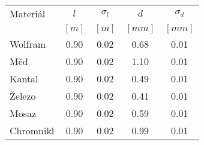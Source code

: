 \begin{tabular}{lSSSS}                                                     \toprule
Materiál  & {$l$}        & {$\sigma_l$} & {$d$}         & {$\sigma_d$}  \\
          & {$[\si{m}]$} & {$[\si{m}]$} & {$[\si{mm}]$} & {$[\si{mm}]$} \\ \midrule
Wolfram   & 0.90         & 0.02         & 0.68          & 0.01          \\
Měď       & 0.90         & 0.02         & 1.10          & 0.01          \\
Kantal    & 0.90         & 0.02         & 0.49          & 0.01          \\
Železo    & 0.90         & 0.02         & 0.41          & 0.01          \\
Mosaz     & 0.90         & 0.02         & 0.59          & 0.01          \\
Chromnikl & 0.90         & 0.02         & 0.99          & 0.01          \\ \bottomrule
\end{tabular}